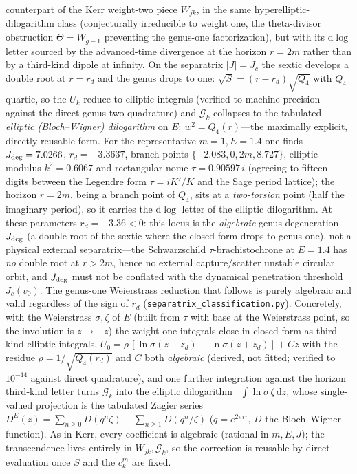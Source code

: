 \documentclass[12pt]{iopart}
\newcommand{\Jc}{J_{c}}
\newcommand{\dd}{\mathrm{d}}
\begin{document}
counterpart of the Kerr weight-two piece $W_{jk}$, in the same
hyperelliptic-dilogarithm class (conjecturally irreducible to weight one, the
theta-divisor obstruction $\Theta=W_{g-1}$ preventing the genus-one factorization),
but with its $\dd\log$ letter sourced by the
advanced-time divergence at the horizon $r=2m$ rather than by a third-kind dipole at
infinity. On the separatrix $|J|=\Jc$ the sextic develops a double root at $r=r_d$
and the genus drops to one: $\sqrt S=(r-r_d)\sqrt{Q_4}$ with $Q_4$ quartic, so the
$U_k$ reduce to elliptic integrals (verified to machine precision against the direct
genus-two quadrature) and $\mathcal{G}_k$ collapses to the tabulated \emph{elliptic
(Bloch--Wigner) dilogarithm} on $E:\,w^2=Q_4(r)$---the maximally explicit, directly
reusable form. For the representative $m=1,E=1.4$ one finds $J_{\rm deg}=7.0266$,
$r_d=-3.3637$, branch points $\{-2.083,0,2m,8.727\}$, elliptic modulus $k^2=0.6067$
and rectangular nome $\tau=0.90597\,i$ (agreeing to fifteen digits between the
Legendre form $\tau=iK'/K$ and the Sage period lattice); the horizon $r=2m$, being a
branch point of $Q_4$, sits at a \emph{two-torsion} point (half the imaginary
period), so it carries the $\dd\log$ letter of the elliptic dilogarithm. At these
parameters $r_d=-3.36<0$: this locus is the \emph{algebraic} genus-degeneration
$J_{\rm deg}$ (a double root of the sextic where the closed form drops to genus one),
not a physical external separatrix---the Schwarzschild $\tau$-brachistochrone at
$E=1.4$ has \emph{no} double root at $r>2m$, hence no external capture$/$scatter
unstable circular orbit, and $J_{\rm deg}$ must not be conflated with the dynamical
penetration threshold $J_c(v_0)$. The genus-one Weierstrass reduction that follows is
purely algebraic and valid regardless of the sign of $r_d$
(\texttt{separatrix\_classification.py}). Concretely,
with the Weierstrass $\sigma,\zeta$ of $E$ (built from $\tau$ with base at the
Weierstrass point, so the involution is $z\to-z$) the weight-one integrals close in
closed form as third-kind elliptic integrals,
$U_0=\rho\,[\ln\sigma(z-z_d)-\ln\sigma(z+z_d)]+Cz$ with the residue
$\rho=1/\sqrt{Q_4(r_d)}$ and $C$ both \emph{algebraic} (derived, not fitted; verified
to $10^{-14}$ against direct quadrature), and one further integration against the
horizon third-kind letter turns $\mathcal{G}_k$ into the elliptic
dilogarithm~\cite{Bloch2000,BeilinsonLevin1994}
$\int\ln\sigma\,\zeta\,\dd z$, whose single-valued projection is the tabulated
Zagier series~\cite{Zagier1990}
$D^E(z)=\sum_{n\ge0}D(q^n\zeta)-\sum_{n\ge1}D(q^n/\zeta)$
($q=e^{2\pi i\tau}$, $D$ the Bloch--Wigner function). As in Kerr, every coefficient is
algebraic (rational in $m,E,J$); the transcendence lives entirely in
$W_{jk},\mathcal{G}_k$, so the correction is reusable by direct evaluation once $S$
and the $c_k^m$ are fixed.
\end{document}
